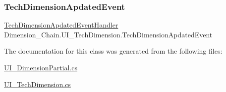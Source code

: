 \subsubsection{\texorpdfstring{Tech\+Dimension\+Apdated\+Event}{TechDimensionApdatedEvent}}
{\footnotesize\ttfamily \mbox{\hyperlink{class_dimension___chain_1_1_u_i___tech_dimension_a55a3d4e5dad3a8b18f8bffb9adf5cb6f}{Tech\+Dimension\+Apdated\+Event\+Handler}} Dimension\+\_\+\+Chain.\+U\+I\+\_\+\+Tech\+Dimension.\+Tech\+Dimension\+Apdated\+Event}



The documentation for this class was generated from the following files\+:\begin{DoxyCompactItemize}
\item 
\mbox{\hyperlink{_u_i___dimension_partial_8cs}{U\+I\+\_\+\+Dimension\+Partial.\+cs}}\item 
\mbox{\hyperlink{_u_i___tech_dimension_8cs}{U\+I\+\_\+\+Tech\+Dimension.\+cs}}\end{DoxyCompactItemize}
